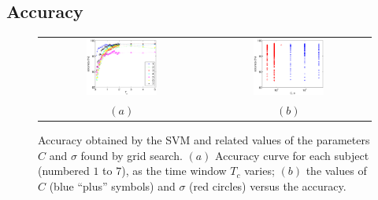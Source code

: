 \documentclass{article}
\begin{document}
\subsection{Accuracy}
\label{subsec:accuracy}

\begin{figure}[!t]
  \centering
    \begin{tabular}{cc}
      \includegraphics[width=0.45\textwidth]{accuracy.eps} &
      \includegraphics[width=0.45\textwidth]{hyperparams.eps} \\
      $(a)$ & $(b)$
    \end{tabular}
    \caption{Accuracy obtained by the SVM and related values of the
    parameters $C$ and $\sigma$ found by grid search. $(a)$ Accuracy
    curve for each subject (numbered $1$ to $7$), as the time window
    $T_c$ varies; $(b)$ the values of $C$ (blue ``plus'' symbols) and
    $\sigma$ (red circles) versus the accuracy.}
    \label{fig:accuracy}
\end{figure}
\end{document}
